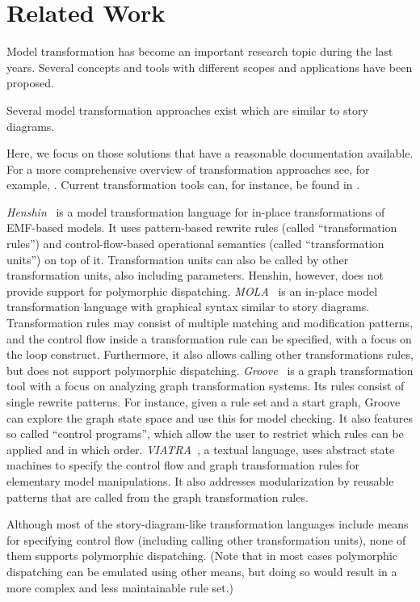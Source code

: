 \chapter{Related Work}

Model transformation has become an important research topic during the last years.
Several concepts and tools with different scopes and applications have been proposed.

Several model transformation approaches exist which are similar to story diagrams.

Here, we focus on those solutions that have a reasonable documentation available.
For a more comprehensive overview of transformation approaches see, for example, \cite{Czarnecki06}.
Current transformation tools can, for instance, be found in \cite{TTC2010}.

\emph{Henshin}~\cite{henshin2} is a model transformation language for in-place transformations of EMF-based models.
It uses pattern-based rewrite rules (called ``transformation rules'') and control-flow-based operational semantics (called ``transformation units'') on top of it.
Transformation units can also be called by other transformation units, also including parameters.
Henshin, however, does not provide support for polymorphic dispatching.
\emph{MOLA}~\cite{mola} is an in-place model transformation language with graphical syntax similar to story diagrams.
Transformation rules may consist of multiple matching and modification patterns, and the control flow inside a transformation rule can be specified, with a focus on the loop construct.  
Furthermore, it also allows calling other transformations rules, but does not support polymorphic dispatching.        
\emph{Groove}~\cite{}  is a graph transformation tool with a focus on analyzing graph transformation systems.
Its rules consist of single rewrite patterns.
For instance, given a rule set and a start graph, Groove can explore the graph state space and use this for model checking.
It also features so called ``control programs'', which allow the user to restrict which rules can be applied and in which order.
\emph{VIATRA}~\cite{viatra}, a textual language, uses abstract state machines to specify the control flow and graph transformation rules for elementary model manipulations.
It also addresses modularization by reusable patterns that are called from the graph transformation rules. 

Although most of the story-diagram-like transformation languages include means for specifying control flow (including calling other transformation units), none of them supports polymorphic dispatching.
(Note that in most cases polymorphic dispatching can be emulated using other means, but doing so would result in a more complex and less maintainable rule set.)

